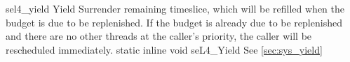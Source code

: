 %
%
%
%

\apidoc
{sel4_yield}
{Yield}
{Surrender remaining timeslice, which will be refilled when the budget is due to be replenished. If the budget is already due to be replenished and there are no other threads at the caller's priority, the caller will be rescheduled immediately.}
{static inline void seL4\_Yield}
{
}
{\noret}
{See \autoref{sec:sys_yield}}
